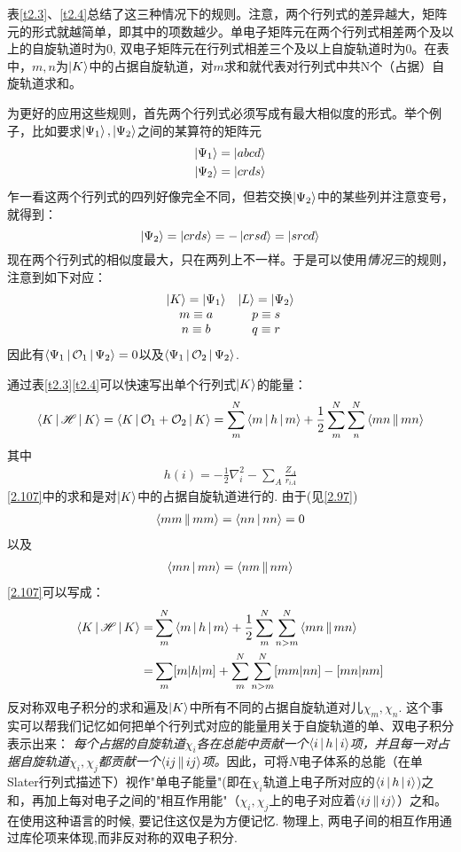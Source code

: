 表\ref{t2.3}、\ref{t2.4}总结了这三种情况下的规则。注意，两个行列式的差异越大，矩阵元的形式就越简单，即其中的项数越少。单电子矩阵元在两个行列式相差两个及以上的自旋轨道时为0, 双电子矩阵元在行列式相差三个及以上自旋轨道时为0。在表中，$m,n$为$\Ket{K}$中的占据自旋轨道，对$m$求和就代表对行列式中共N个（占据）自旋轨道求和。

为更好的应用这些规则，首先两个行列式必须写成有最大相似度的形式。举个例子，比如要求$\Ket{\Psi_1},\Ket{\Psi_2}$之间的某算符的矩阵元
\begin{align}
\Ket{\Psi_1}=\Ket{abcd}\notag\\
\Ket{\Psi_2}=\Ket{crds}\notag
\end{align}
乍一看这两个行列式的四列好像完全不同，但若交换$\Ket{\Psi_2}$中的某些列并注意变号，就得到：
\begin{equation*}
\Ket{\Psi_2}=\Ket{crds}=-\Ket{crsd}=\Ket{srcd}
\end{equation*}
现在两个行列式的相似度最大，只在两列上不一样。于是可以使用{\textit{情况三}}的规则，注意到如下对应：
\[\begin{array}{cc}
\Ket{K}=\Ket{\Psi_1}&\Ket{L}=\Ket{\Psi_2}\\
m\equiv a & p\equiv s\\
n\equiv b &q\equiv r
\end{array}\]
因此有$\Braket{\Psi_1|\mathcal{O}_1|\Psi_2}=0$以及$\Braket{\Psi_1|\mathcal{O}_2|\Psi_2}$.

通过表\ref{t2.3}\ref{t2.4}可以快速写出单个行列式$\Ket{K}$的能量：
\begin{align}
\label{2.107}
\Braket{K|\mathscr{H}|K}=\Braket{K|\mathcal{O}_1+\mathcal{O}_2|K}=\sum_m^N\Braket{m|h|m}+\frac{1}{2}\sum_m^N\sum_n^N\Braket{mn||mn}
\end{align}
其中
\begin{align}
\label{2.108}
h(i)=-\frac{1}{2}\nabla_i^2-\sum_A\frac{Z_A}{r_{iA}}
\end{align}
\ref{2.107}中的求和是对$\Ket{K}$中的占据自旋轨道进行的. 由于(见\ref{2.97})
\begin{align}
\Braket{mm||mm}=\Braket{nn|nn}=0
\end{align}
以及
\begin{align}
\Braket{mn|mn}=\Braket{nm||nm}
\end{align}
\ref{2.107}可以写成：
\begin{align}
\Braket{K|\mathscr{H}|K}=&\sum_m^N\Braket{m|h|m}+\frac{1}{2}\sum_m^N\sum_{n>m}^N\Braket{mn||mn}\\
=&\sum_m[m|h|m]+\sum_m^N\sum_{n>m}^N[mm|nn]-[mn|nm]
\end{align}
反对称双电子积分的求和遍及$\Ket{K}$中所有不同的占据自旋轨道对儿$\chi_m,\chi_n$. 这个事实可以帮我们记忆如何把单个行列式对应的能量用关于自旋轨道的单、双电子积分表示出来：\textit{ 每个占据的自旋轨道$\chi_i$各在总能中贡献一个$\Braket{i|h|i}$项，并且每一对占据自旋轨道$\chi_i,\chi_j$都贡献一个$\Braket{ij||ij}$项。}因此，可将$N$电子体系的总能（在单Slater行列式描述下）视作"单电子能量"(即在$\chi_i$轨道上电子所对应的$\Braket{i|h|i}$)之和，再加上每对电子之间的"相互作用能"（$\chi_i,\chi_j$上的电子对应着$\Braket{ij||ij}$）之和。在使用这种语言的时候, 要记住这仅是为方便记忆. 物理上, 两电子间的相互作用通过库伦项来体现,而非反对称的双电子积分.

